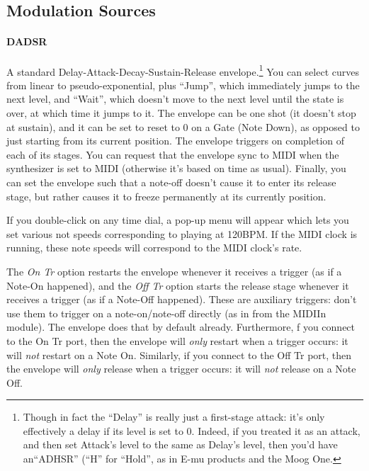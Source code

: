 \documentclass{article}
\begin{document}
\subsection{Modulation Sources}
\label{modsources}

\paragraph{DADSR}  A standard Delay-Attack-Decay-Sustain-Release envelope.\footnote{Though in fact the ``Delay'' is really just a first-stage attack: it's only effectively a delay if its level is set to 0.  Indeed, if you treated it as an attack, and then set Attack's level to the same as Delay's level, then you'd have an``ADHSR'' (``H'' for ``Hold'', as in E-mu products and the Moog One.} You can select curves from linear to pseudo-exponential, plus ``Jump'', which immediately jumps to the next level, and ``Wait'', which doesn't move to the next level until the state is over, at which time it jumps to it.  The envelope can be one shot (it doesn't stop at sustain), and it can be set to reset to 0 on a Gate (Note Down), as opposed to just starting from its current position.  The envelope triggers on completion of each of its stages.  You can request that the envelope sync to MIDI when the synthesizer is set to MIDI (otherwise it's based on time as usual).  Finally, you can set the envelope such that a note-off doesn't cause it to enter its release stage, but rather causes it to freeze permanently at its currently position.

If you double-click on any time dial, a pop-up menu will appear which lets you set various not speeds corresponding to playing at 120BPM.  If the MIDI clock is running, these note speeds will correspond to the MIDI clock's rate.

The {\it On Tr} option restarts the envelope whenever it receives a trigger (as if a Note-On happened), and the {\it Off Tr} option starts the release stage whenever it receives a trigger (as if a Note-Off happened).  These are auxiliary triggers: don't use them to trigger on a note-on/note-off directly (as in from the MIDIIn module).  The envelope does that by default already.  Furthermore, f you connect to the On Tr port, then the envelope will {\it only} restart when a trigger occurs: it will {\it not} restart on a Note On.  Similarly, if you connect to the Off Tr port, then the envelope will {\it only} release when a trigger occurs: it will {\it not} release on a Note Off.
 
\end{document}
